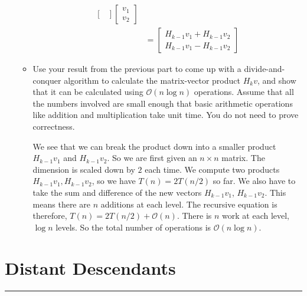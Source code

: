 \documentclass{article}
\begin{document}
\begin{itemize}
\begin{itemize}
\begin{answer}
\begin{align*}
\begin{bmatrix}
                                       \end{bmatrix}\begin{bmatrix}
                                           v_{1} \\
                                           v_{2}   
                                       \end{bmatrix}       \\
                                       &= \begin{bmatrix}
                                           H_{k - 1}v_{1} + H_{k - 1}v_{2} \\
                                           H_{k - 1}v_{1} - H_{k - 1}v_{2}   
                                       \end{bmatrix}         
                            \end{align*}
                    \end{answer}

                \item Use your result from the previous part to come up with a divide-and-conquer algorithm to calculate the matrix-vector product $H_{k}v$, and show that it can be calculated using $\mathcal{O}(n \log{n})$ operations. Assume that all the numbers involved are small enough that basic arithmetic operations like addition and multiplication take unit time. You do not need to prove correctness. 
                    \begin{answer}
                        We see that we can break the product down into a smaller product $H_{k - 1}v_{1}$ and $H_{k - 1}v_{2}$. So we are first given an $n \times n$ matrix. The dimension is scaled down by $2$ each time. We compute two products $H_{k - 1}v_{1}, H_{k - 1}v_{2}$, so we have $T(n) = 2T(n / 2)$ so far. We also have to take the sum and difference of the new vectors $H_{k - 1}v_{1}$, $H_{k - 1}v_{2}$. This means there are $n$ additions at each level. The recursive equation is therefore, $T(n) = 2T(n / 2) + \mathcal{O}(n)$. There is $n$ work at each level, $\log{n}$ levels. So the total number of operations is $\mathcal{O}(n \log{n})$.
                    \end{answer}
            \end{itemize}
    \end{itemize}

\newpage
\section*{Distant Descendants}
\hrule
\end{document}
